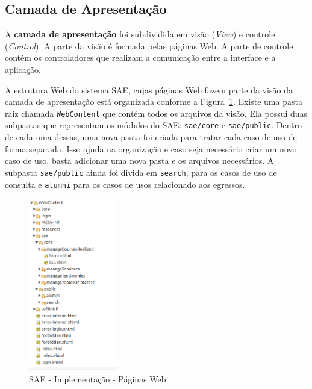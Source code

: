 \subsection{Camada de Apresentação}
\label{sec-projeto-arquitetura-sistema-camada-apresentacao}

A \textbf{camada de apresentação} foi subdividida em visão (\textit{View}) e controle (\textit{Control}). A parte da visão é formada pelas páginas Web. A parte de controle contém os controladores que realizam a comunicação entre a interface e a aplicação.



A estrutura Web do sistema SAE, cujas páginas Web fazem parte da visão da camada de apresentação está organizada conforme a Figura~\ref{fig-projeto-arquitetura-paginas-web}. Existe uma pasta raiz chamada \texttt{WebContent} que contém todos os arquivos da visão. Ela possui duas subpastas que representam os módulos do SAE: \texttt{sae/core} e \texttt{sae/public}. Dentro de cada uma dessas, uma nova pasta foi criada para tratar cada caso de uso de forma separada. Isso ajuda na organização e caso seja necessário criar um novo caso de uso, basta adicionar uma nova pasta e os arquivos necessários. A subpasta \texttt{sae/public} ainda foi divida em \texttt{search}, para os casos de uso de consulta e \texttt{alumni} para os casos de usos relacionado aos egressos. 

\begin{figure}[h]
	\centering
	\includegraphics[width=0.35\textwidth]{figuras/projeto/fig-projeto-arquitetura-paginas-web}
	\caption{SAE - Implementação - Páginas Web}
	\label{fig-projeto-arquitetura-paginas-web}
\end{figure}

